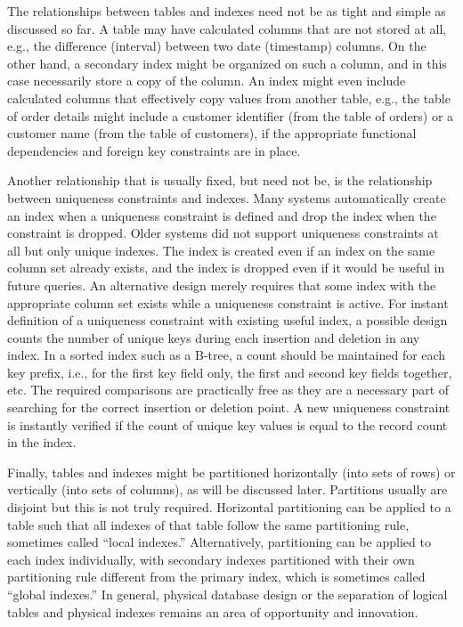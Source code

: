The relationships between tables and indexes need not be as tight and
simple as discussed so far. A table may have calculated columns that are
not stored at all, e.g., the difference (interval) between two date
(timestamp) columns. On the other hand, a secondary index might be
organized on such a column, and in this case necessarily store a copy of
the column. An index might even include calculated columns that
effectively copy values from another table, e.g., the table of order
details might include a customer identifier (from the table of orders)
or a customer name (from the table of customers), if the appropriate
functional dependencies and foreign key constraints are in place.

Another relationship that is usually fixed, but need not be, is the
relationship between uniqueness constraints and indexes. Many systems
automatically create an index when a uniqueness constraint is defined
and drop the index when the constraint is dropped. Older systems did not
support uniqueness constraints at all but only unique indexes. The index
is created even if an index on the same column set already exists, and
the index is dropped even if it would be useful in future queries. An
alternative design merely requires that some index with the appropriate
column set exists while a uniqueness constraint is active. For instant
definition of a uniqueness constraint with existing useful index, a
possible design counts the number of unique keys during each insertion
and deletion in any index. In a sorted index such as a B-tree, a count
should be maintained for each key prefix, i.e., for the first key field
only, the first and second key fields together, etc. The required
comparisons are practically free as they are a necessary part of
searching for the correct insertion or deletion point. A new uniqueness
constraint is instantly verified if the count of unique key values is
equal to the record count in the index.

Finally, tables and indexes might be partitioned horizontally (into sets
of rows) or vertically (into sets of columns), as will be discussed
later. Partitions usually are disjoint but this is not truly required.
Horizontal partitioning can be applied to a table such that all indexes
of that table follow the same partitioning rule, sometimes called
``local indexes.'' Alternatively, partitioning can be applied to each
index individually, with secondary indexes partitioned with their own
partitioning rule different from the primary index, which is sometimes
called ``global indexes.'' In general, physical database design or the
separation of logical tables and physical indexes remains an area of
opportunity and innovation.

